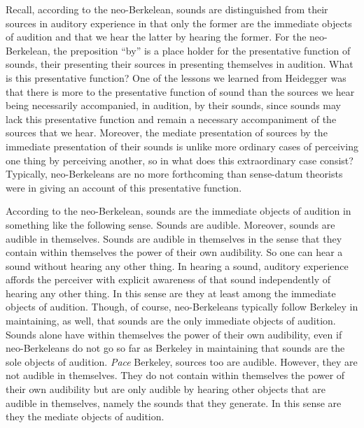 Recall, according to the neo-Berkelean, sounds are distinguished from their sources in auditory experience in that only the former are the immediate objects of audition and that we hear the latter by hearing the former. For the neo-Berkelean, the preposition ``by'' is a place holder for the presentative function of sounds, their presenting their sources in presenting themselves in audition. What is this presentative function? One of the lessons we learned from Heidegger was that there is more to the presentative function of sound than the sources we hear being necessarily accompanied, in audition, by their sounds, since sounds may lack this presentative function and remain a necessary accompaniment of the sources that we hear. Moreover, the mediate presentation of sources by the immediate presentation of their sounds is unlike more ordinary cases of perceiving one thing by perceiving another, so in what does this extraordinary case consist? Typically, neo-Berkeleans are no more forthcoming than sense-datum theorists were in giving an account of this presentative function.

According to the neo-Berkelean, sounds are the immediate objects of audition in something like the following sense. Sounds are audible. Moreover, sounds are audible in themselves. Sounds are audible in themselves in the sense that they contain within themselves the power of their own audibility. So one can hear a sound without hearing any other thing. In hearing a sound, auditory experience affords the perceiver with explicit awareness of that sound independently of hearing any other thing. In this sense are they at least among the immediate objects of audition. Though, of course, neo-Berkeleans typically follow Berkeley in maintaining, as well, that sounds are the only immediate objects of audition. Sounds alone have within themselves the power of their own audibility, even if neo-Berkeleans do not go so far as Berkeley in maintaining that sounds are the sole objects of audition. \emph{Pace} Berkeley, sources too are audible. However, they are not audible in themselves. They do not contain within themselves the power of their own audibility but are only audible by hearing other objects that are audible in themselves, namely the sounds that they generate. In this sense are they the mediate objects of audition.

